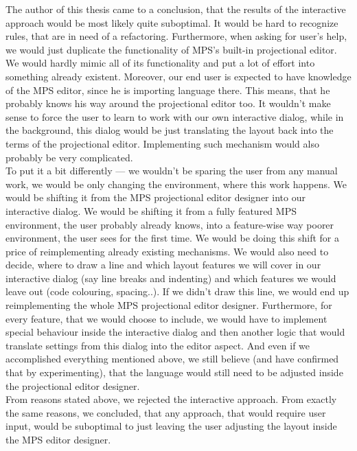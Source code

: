 The author of this thesis came to a conclusion, that the results of the interactive approach would be most likely quite suboptimal.
It would be hard to recognize rules, that are in need of a refactoring.
Furthermore, when asking for user's help, we would just duplicate the functionality of MPS's built-in projectional editor.
We would hardly mimic all of its functionality and put a lot of effort into something already existent.
Moreover, our end user is expected to have knowledge of the MPS editor, since he is importing language there.
This means, that he probably knows his way around the projectional editor too.
It wouldn't make sense to force the user to learn to work with our own interactive dialog, while in the background, this dialog would be just translating the layout back into the terms of the projectional editor.
Implementing such mechanism would also probably be very complicated.
\\

To put it a bit differently --- we wouldn't be sparing the user from any manual work, we would be only changing the environment, where this work happens.
We would be shifting it from the MPS projectional editor designer into our interactive dialog.
We would be shifting it from a fully featured MPS environment, the user probably already knows, into a feature-wise way poorer environment, the user sees for the first time.
We would be doing this shift for a price of reimplementing already existing mechanisms.
We would also need to decide, where to draw a line and which layout features we will cover in our interactive dialog (say line breaks and indenting) and which features we would leave out (code colouring, spacing..).
If we didn't draw this line, we would end up reimplementing the whole MPS projectional editor designer.
Furthermore, for every feature, that we would choose to include, we would have to implement special behaviour inside the interactive dialog and then another logic that would translate settings from this dialog into the editor aspect.
And even if we accomplished everything mentioned above, we still believe (and have confirmed that by experimenting), that the language would still need to be adjusted inside the projectional editor designer.
\\

From reasons stated above, we rejected the interactive approach.
From exactly the same reasons, we concluded, that any approach, that would require user input, would be suboptimal to just leaving the user adjusting the layout inside the MPS editor designer.

